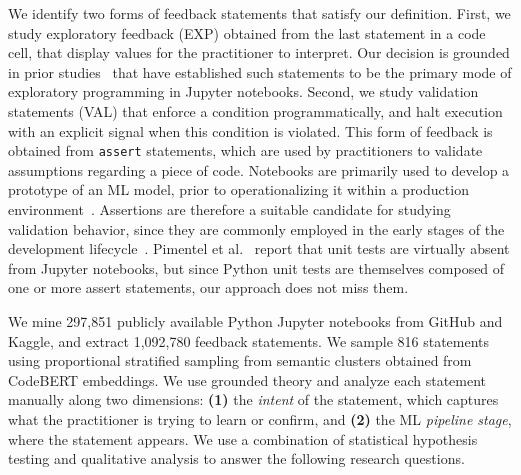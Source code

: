 \documentclass[a4paper,USenglish,cleveref,autoref,thm-restate,anonymous]{lipics-v2021}       %
\begin{document}
We identify two forms of feedback statements that satisfy our definition.
First, we study exploratory feedback (EXP)
obtained from the last statement in a code cell,
that display values for the practitioner to interpret.
Our decision is grounded in prior studies~\cite{kery2018story,rule2018exploration}
that have established such statements
to be the primary mode of exploratory programming in Jupyter notebooks.
Second, we study validation statements (VAL)
that enforce a condition programmatically,
and halt execution with an explicit signal
when this condition is violated.
This form of feedback is obtained from \lstinline{assert} statements,
which are used by practitioners to validate assumptions regarding a piece of code.
Notebooks are primarily used to develop a prototype of an ML model,
prior to operationalizing it within a production environment~\cite{shankar2024we,nahar2023meta-summary}.
Assertions are therefore a suitable candidate for studying validation behavior,
since they are commonly employed in the early stages of the development lifecycle~\cite{kochhar2017revisiting}.
Pimentel et al.~\cite{pimentel2019large-scale} report
that unit tests are virtually absent from Jupyter notebooks,
but since Python unit tests are themselves composed of one or more assert statements,
our approach does not miss them.

We mine 297,851 publicly available Python Jupyter notebooks
from GitHub and Kaggle,
and extract 1,092,780 feedback statements.
We sample 816 statements
using proportional stratified sampling
from semantic clusters obtained from CodeBERT embeddings.
We use grounded theory
and analyze each statement manually along two dimensions:
\textbf{(1)} the \emph{intent} of the statement,
which captures what the practitioner is trying to learn or confirm,
and \textbf{(2)} the ML \emph{pipeline stage},
where the statement appears.
We use a combination of statistical hypothesis testing
and qualitative analysis
to answer the following research questions.
\end{document}
